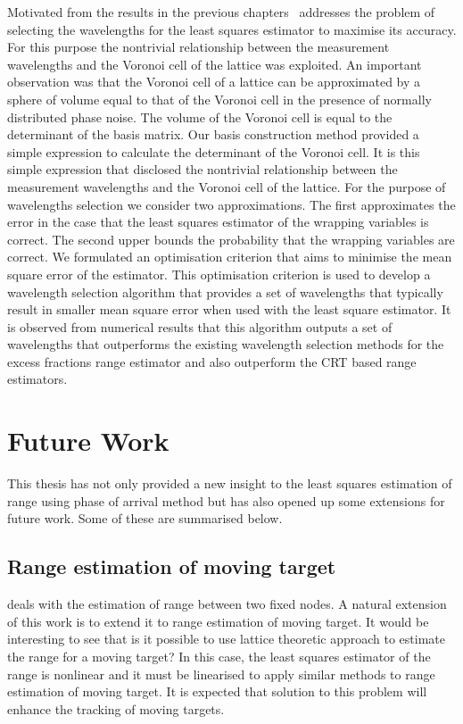 Motivated from the results in the previous chapters~ addresses the problem of selecting the wavelengths for the least squares estimator to maximise its accuracy. For this purpose the nontrivial relationship between the measurement wavelengths and the Voronoi cell of the lattice was exploited.  An important observation was that the Voronoi cell of a lattice can be approximated by a sphere of volume equal to that of the Voronoi cell in the presence of normally distributed phase noise. The volume of the Voronoi cell is equal to the determinant of the basis matrix. Our basis construction method provided a simple expression to calculate the determinant of the Voronoi cell. It is this simple expression that disclosed the nontrivial relationship between the measurement wavelengths and the Voronoi cell of the lattice. For the purpose of wavelengths selection we consider two approximations. The first approximates the error in the case that the least squares estimator of the wrapping variables is correct. The second upper bounds the probability that the wrapping variables are correct. We formulated an optimisation criterion that aims to minimise the mean square error of the estimator. This optimisation criterion is used to develop a wavelength selection algorithm that provides a set of wavelengths that typically result in smaller mean square error when used with the least square estimator. It is observed from numerical results that this algorithm outputs a set of wavelengths that outperforms the existing wavelength selection methods for the excess fractions range estimator and also outperform the CRT based range estimators.

\section{Future Work}
This thesis has not only provided a new insight to the least squares estimation of range using phase of arrival method but has also opened up some extensions for future work. Some of these are summarised below.

\subsection*{Range estimation of moving target}
 deals with the estimation of range between two fixed nodes. A natural extension of this work is to extend it to range estimation of moving target. It would be interesting to see that is it possible to use lattice theoretic approach to estimate the range for a moving target? In this case, the least squares estimator of the range is nonlinear and it must be linearised to apply similar methods to range estimation of moving target. It is expected that solution to this problem will enhance the tracking of moving targets.

